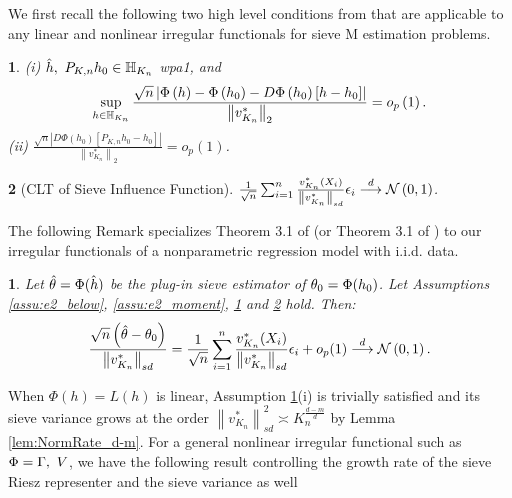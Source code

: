 \documentclass[12pt,american]{article}
\theoremstyle{definition}
\theoremstyle{plain}
\newtheorem{assumption}{\protect\assumptionname}
\theoremstyle{definition}
\theoremstyle{plain}
\theoremstyle{plain}
\theoremstyle{plain}
\theoremstyle{plain}
\newtheorem{rem}{\protect\remarkname}
\theoremstyle{plain}
\newcommand{\norm}[1]{\left\| #1 \right\|}
\providecommand{\assumptionname}{Assumption}
\providecommand{\remarkname}{Remark}
\providecommand{\assumptionname}{Assumption}
\begin{document}
We first recall the following two high level conditions from \citet*{chen2014sieve} that are applicable to any linear and nonlinear irregular functionals for sieve M estimation problems.

\begin{assumption}
\label{assu:LinRem_Small} (i) $\hat{h},~P_{K,n}h_0 \in \mathbb{H}_{K_{n}}$ wpa1, and
\begin{equation}
\sup_{h\in\H_{K_{n}}}\frac{\sqrt{n}\left|\Phi\left(h\right)-\Phi\left(h_{0}\right)-D\Phi\left(h_{0}\right)\left[h-h_{0}\right]\right|}{\norm{v^*_{K_n}}_2}=o_{p}\left(1\right).\label{eq:LinRemSmall}
\end{equation}
(ii) $\frac{\sqrt{n}\left|D\Phi( h_{0})\left[P_{K,n}h_0 -h_{0}\right]\right|}{\norm{v^*_{K_n}}_2}=o_{p}\left(1\right)$.
\end{assumption}
\begin{assumption}[CLT of Sieve Influence Function]
\label{assu:sieveIF}$\frac{1}{\sqrt{n}}\sum_{i=1}^n \frac{v_{K_n}^*(X_i)}{\norm{v_{K_{n}}^{*}}_{sd}}\e_i \dto\cN\left(0,1\right)$.
\end{assumption}

The following Remark specializes Theorem 3.1 of \citet*{chen2014sieve} (or Theorem 3.1 of \citet*{chen2015optimal})
to our irregular functionals of a nonparametric regression model with i.i.d. data.

\begin{rem} Let $\hat{\theta}=\Phi(\hat{h})$ be the plug-in sieve estimator of $\theta_0=\Phi(h_0)$. Let Assumptions \ref{assu:e2_below}, \ref{assu:e2_moment}, \ref{assu:LinRem_Small} and \ref{assu:sieveIF}
hold. Then:
\[
\frac{\sqrt{n}\left(\hat{\t}-\t_{0}\right)}{\norm{v_{K_{n}}^{*}}_{sd}} = \frac{1}{\sqrt{n}}\sum_{i=1}^n \frac{v_{K_n}^*(X_i)}{\norm{v_{K_{n}}^{*}}_{sd}}\e_i +o_p(1)\dto\cN\left(0,1\right).
\]
\end{rem}

When $\Phi(h)=L(h)$ is linear, Assumption \ref{assu:LinRem_Small}(i) is trivially satisfied and its sieve variance grows at the order $\norm{v_{K_{n}}^{*}}_{sd}^2\asymp {K_{n}^{\frac{d-m}{d}}}$ by Lemma \ref{lem:NormRate_d-m}. For a general nonlinear irregular functional such as $\Phi=\Gamma,~V$, we have the following result controlling the growth rate of the sieve Riesz representer and the sieve variance as well
\end{document}
